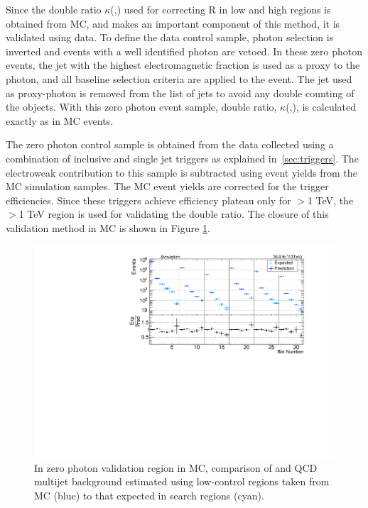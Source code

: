 Since the double ratio $\kappa$(\nj,\nb) used for correcting R in low and high \ptmiss regions is obtained from MC, and makes an important component of this method, it is validated using data. To define the data control sample, photon selection is inverted and events with a well identified photon are vetoed. In these zero photon events, the jet with the highest electromagnetic fraction is used as a proxy to the photon, and all baseline selection criteria are applied to the event. The jet used as proxy-photon is removed from the list of jets to avoid any double counting of the objects. With this zero photon event sample, double ratio, $\kappa$(\nj,\nb), is calculated exactly as in MC events. 

The zero photon control sample is obtained from the data collected using a combination of inclusive \HT and single jet triggers as explained in~\ref{sec:triggers}. The electroweak contribution to this sample is subtracted using event yields from the MC simulation samples. The MC event yields are corrected for the trigger efficiencies. Since these triggers achieve efficiency plateau only for \HT$>$1 TeV, the \HT$>$1 TeV region is used for validating the double ratio. The closure of this validation method in MC is shown in Figure \ref{fig:no_photon_closure}. 
\begin{figure}[h!]
\centering
\includegraphics[width=0.85\linewidth]{../Figures/Chap3/SUSY_Photon_MET_JbJ_18Aug17/FakeMET/doubleR_ST1000.pdf}
\caption[Closure for VR]{In zero photon validation region in MC, comparison of \gjets and QCD multijet background estimated using low-\dphi control regions taken from MC (blue) to that expected in search regions (cyan).}
\label{fig:no_photon_closure}
\end{figure}

